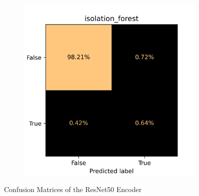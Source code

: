 \begin{figure}[!ht]
\begin{subfigure}{0.4\textwidth}
        \includegraphics[width=\textwidth]{./results/resnet50_vgg19/20230514_213740_isolation_forest_cm.png}
    \end{subfigure}
    \caption{Confusion Matrices of the ResNet50 Encoder}
    \label{fig:resnet50_cm}
\end{figure}